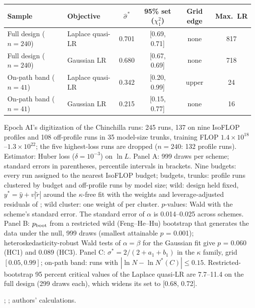 \begin{table}[tp]
\begin{tabular*}{\textwidth}{@{\extracolsep{\fill}}lccccccc@{}}
Sample & \multicolumn{2}{l}{Objective} & $\hat\sigma^*$ & \multicolumn{2}{c}{95\% set ($\chi^2_1$)} & Grid edge & Max.\ LR \\
\midrule
Full design ($n=240$) & \multicolumn{2}{l}{Laplace quasi-LR} & 0.701 & \multicolumn{2}{c}{[0.69, 0.71]} & none & 817 \\
Full design ($n=240$) & \multicolumn{2}{l}{Gaussian LR} & 0.680 & \multicolumn{2}{c}{[0.67, 0.69]} & none & 718 \\
On-path band ($n=41$) & \multicolumn{2}{l}{Laplace quasi-LR} & 0.342 & \multicolumn{2}{c}{[0.20, 0.99]} & upper & 24 \\
On-path band ($n=41$) & \multicolumn{2}{l}{Gaussian LR} & 0.215 & \multicolumn{2}{c}{[0.15, 0.77]} & none & 16 \\
\bottomrule
\end{tabular*}
\par\smallskip
\begin{tablenotes}
Epoch AI's digitization of the Chinchilla runs: 245 runs, 137 on nine IsoFLOP profiles and 108 off-profile runs in
35 model-size trunks, training FLOP $1.4\times10^{18}$--$1.3\times10^{22}$; the five highest-loss runs are dropped
($n=240$: 132 profile runs). Estimator: Huber loss ($\delta=10^{-3}$) on $\ln L$. Panel A: 999 draws per scheme;
standard errors in parentheses, percentile intervals in brackets. Nine budgets: every run assigned to the nearest
IsoFLOP budget; budgets, trunks: profile runs clustered by budget and off-profile runs by model size; wild: design
held fixed, $y^*=\hat y+v|\tilde r|$ around the $\kappa$-free fit with the weights and leverage-adjusted residuals of
\citet{feng2011wild}; wild cluster: one weight of \citet{webb2023reworking} per cluster. $p$-values: Wald with the
scheme's standard error. The standard error of $\alpha$ is 0.014--0.025 across schemes. Panel B: $p_{\rm boot}$ from a
restricted wild (Feng--He--Hu) bootstrap that generates the data under the null, 999 draws (smallest attainable $p$ =
0.001); heteroskedasticity-robust Wald tests of $\alpha=\beta$ for the Gaussian fit give $p$ = 0.060 (HC1) and 0.089
(HC3). Panel C: $\sigma^*=2/(2+a_1+b_1)$ in the $\kappa$ family, grid $[0.05,0.99]$; on-path band: runs with $|\ln N-\ln N^*(C)|\le0.15$.
Restricted-bootstrap 95 percent critical values of the Laplace quasi-LR are 7.7--11.4 on the full design (299 draws
each), which widens its set to [0.68, 0.72].
\end{tablenotes}
\begin{tablenotes}[Source]
\citet{hoffmann2022training}; \citet{besiroglu2024chinchilla}; authors' calculations.
\end{tablenotes}
\end{table}
